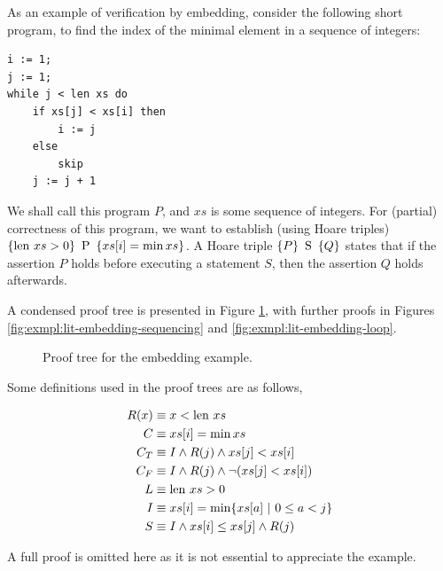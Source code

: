 \begin{example}
  \label{exmpl:lit-embedding}
  As an example of verification by embedding, consider the following
  short program, to find the index of the minimal element in a
  sequence of integers:

\begin{lstlisting}
i := 1;
j := 1;
while j < len xs do
    if xs[j] < xs[i] then
        i := j
    else
        skip
    j := j + 1
\end{lstlisting}

  We shall call this program $P$, and $xs$ is some sequence of
  integers. For (partial) correctness of this program, we want to
  establish (using Hoare triples) $\htriple{\len xs > 0}{P}{xs[i] =
    \min xs}$. A Hoare triple $\htriple{P}{S}{Q}$ states that if the
  assertion $P$ holds before executing a statement $S$, then the
  assertion $Q$ holds afterwards.

  A condensed proof tree is presented in Figure
  \ref{fig:exmpl:lit-embedding-tree}, with further proofs in Figures
  \ref{fig:exmpl:lit-embedding-sequencing} and
  \ref{fig:exmpl:lit-embedding-loop}.

  \begin{figure}[t]
    \centering
    \begin{prooftree}


    \end{prooftree}
    \caption{Proof tree for the embedding example.}
    \label{fig:exmpl:lit-embedding-tree}
  \end{figure}

  Some definitions used in the proof trees are as follows,

  \begin{align*}
    R(x) &\equiv x < \len xs\\
    C    &\equiv xs[i] = \min xs\\
    C_{T} & \equiv I \land R(j) \land xs[j] < xs[i]\\
    C_{F} & \equiv I \land R(j) \land \lnot(xs[j] < xs[i])\\
    L    & \equiv \len xs > 0\\
    I    & \equiv xs[i] = \min \{xs[a]~|~0 \leq a < j\}\\
    S    & \equiv I \land xs[i] \leq xs[j] \land R(j)
  \end{align*}

  A full proof is omitted here as it is not essential to appreciate
  the example.
\end{example}

